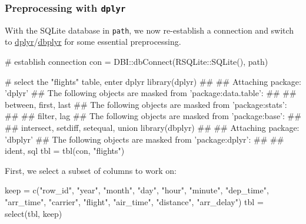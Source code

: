 \documentclass[]{article}
\newenvironment{Shaded}{}{}
\newcommand{\CommentTok}[1]{\textcolor[rgb]{0.00,0.50,0.00}{#1}}
\newcommand{\KeywordTok}[1]{\textcolor[rgb]{0.00,0.00,1.00}{#1}}
\newcommand{\NormalTok}[1]{#1}
\newcommand{\OperatorTok}[1]{#1}
\newcommand{\StringTok}[1]{\textcolor[rgb]{0.00,0.50,0.50}{#1}}
\renewenvironment{Shaded} {\begin{snugshade}\small} {\end{snugshade}}
\begin{document}
\hypertarget{preprocessing-with-dplyr}{%
\subsubsection{\texorpdfstring{Preprocessing with \texttt{dplyr}}{Preprocessing with dplyr}}\label{preprocessing-with-dplyr}}

With the SQLite database in \texttt{path}, we now re-establish a connection and switch to \href{https://cran.r-project.org/package=dplyr}{dplyr}/\href{https://cran.r-project.org/package=dbplyr}{dbplyr} for some essential preprocessing.

\begin{Shaded}
\begin{Highlighting}[]
\CommentTok{# establish connection}
\NormalTok{con =}\StringTok{ }\NormalTok{DBI}\OperatorTok{::}\KeywordTok{dbConnect}\NormalTok{(RSQLite}\OperatorTok{::}\KeywordTok{SQLite}\NormalTok{(), path)}

\CommentTok{# select the "flights" table, enter dplyr}
\KeywordTok{library}\NormalTok{(dplyr)}
\NormalTok{## }
\NormalTok{## Attaching package: 'dplyr'}
\NormalTok{## The following objects are masked from 'package:data.table':}
\NormalTok{## }
\NormalTok{##     between, first, last}
\NormalTok{## The following objects are masked from 'package:stats':}
\NormalTok{## }
\NormalTok{##     filter, lag}
\NormalTok{## The following objects are masked from 'package:base':}
\NormalTok{## }
\NormalTok{##     intersect, setdiff, setequal, union}
\KeywordTok{library}\NormalTok{(dbplyr)}
\NormalTok{## }
\NormalTok{## Attaching package: 'dbplyr'}
\NormalTok{## The following objects are masked from 'package:dplyr':}
\NormalTok{## }
\NormalTok{##     ident, sql}
\NormalTok{tbl =}\StringTok{ }\KeywordTok{tbl}\NormalTok{(con, }\StringTok{"flights"}\NormalTok{)}
\end{Highlighting}
\end{Shaded}

First, we select a subset of columns to work on:

\begin{Shaded}
\begin{Highlighting}[]
\NormalTok{keep =}\StringTok{ }\KeywordTok{c}\NormalTok{(}\StringTok{"row_id"}\NormalTok{, }\StringTok{"year"}\NormalTok{, }\StringTok{"month"}\NormalTok{, }\StringTok{"day"}\NormalTok{, }\StringTok{"hour"}\NormalTok{, }\StringTok{"minute"}\NormalTok{, }\StringTok{"dep_time"}\NormalTok{,}
  \StringTok{"arr_time"}\NormalTok{, }\StringTok{"carrier"}\NormalTok{, }\StringTok{"flight"}\NormalTok{, }\StringTok{"air_time"}\NormalTok{, }\StringTok{"distance"}\NormalTok{, }\StringTok{"arr_delay"}\NormalTok{)}
\NormalTok{tbl =}\StringTok{ }\KeywordTok{select}\NormalTok{(tbl, keep)}
\end{Highlighting}
\end{Shaded}
\end{document}
